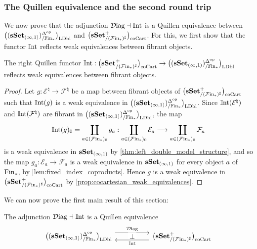 \documentclass[10pt,reqno]{amsart}
\begin{document}
\subsubsection{The Quillen equivalence and the second round trip}
\label{subsubsec:quillen_equivalence}

We now prove that the adjunction $\Diag\dashv\Int$ is a Quillen
equivalence between $\ldblfib$ and $\cocart$. For this, we first
show that the functor $\Int$ reflects weak equivalences between
fibrant objects.

\begin{lemma}
\label{lem:internalization_reflects_fibrant_equivalences}
The right Quillen functor $\Int:\cocart\to\ldblfib$ reflects weak
equivalences between fibrant objects.
\end{lemma}

\begin{proof}
Let $g:\mathcal E^\natural\to \mathcal F^\natural$ be a map between
fibrant objects of $\cocart$ such that $\Int(g)$ is a weak
equivalence in $\ldblfib$. Since $\Int(\mathcal E^\natural)$ and
$\Int(\mathcal F^\natural)$ are fibrant in $\ldblfib$, the map
\[
 \Int(g)_0=\coprod_{a\in (\simFin)_0}g_a:
 \coprod_{a\in (\simFin)_0}\mathcal E_a\longrightarrow\coprod_{a\in (\simFin)_0}\mathcal F_a
\]
is a weak equivalence in $\sset_{(\infty,1)}$ by
\cref{thm:left_double_model_structure}, and so the map
$g_a:\mathcal E_a\to \mathcal F_a$ is a weak equivalence in
$\sset_{(\infty,1)}$ for every object $a$ of $\Fin$, by
\cref{lem:fixed_index_coproducts}. Hence $g$ is a weak equivalence
in $\cocart$ by \cref{prop:cocartesian_weak_equivalences}.
\end{proof}

We can now prove the first main result of this section:

\begin{theorem}
\label{thm:left_double_cocart_quillen_equivalence}
The adjunction $\Diag\dashv\Int$ is a Quillen equivalence
\[\adjunction{\ldblfib}{\cocart}{\Diag}{\Int}
\]
\end{theorem}
\end{document}
